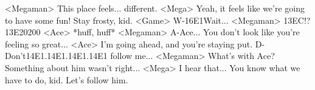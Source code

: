 <Megaman> This place feels... different. 
<Mega> Yeah, it feels like we're going to have some fun! 
Stay frosty, kid. 
<Game> W-{16}{E1}Wait... 
<Megaman> {13}{EC}!? 
{13}{E2}{02}{00}
<Ace> *huff, huff* 
<Megaman> A-Ace... 
You don't look like you're feeling so great... 
<Ace> I'm going ahead, and you're staying put. 
D-Don't{14}{E1}.{14}{E1}.{14}{E1}.{14}{E1} follow me... 
<Megaman> What's with Ace? 
Something about him wasn't right... 
<Mega> I hear that... 
You know what we have to do, kid. Let's follow him. 
